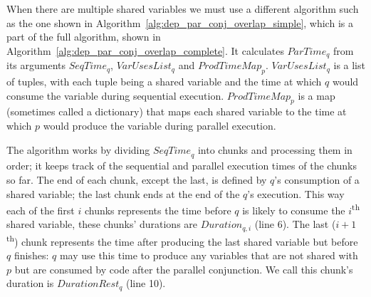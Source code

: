 When there are multiple shared variables we must use a different algorithm
such as the one shown in Algorithm~\ref{alg:dep_par_conj_overlap_simple},
which is a part of the full algorithm, shown in
Algorithm~\ref{alg:dep_par_conj_overlap_complete}.
It calculates $ParTime_q$ from its arguments $SeqTime_q$, $VarUsesList_q$ and
$ProdTimeMap_p$.
$VarUsesList_q$ is a list of tuples,
with each tuple being a shared variable and the time at which $q$ would
consume the variable during sequential execution.
$ProdTimeMap_p$ is a map (sometimes called a dictionary)
that maps each shared variable to the time at which $p$ would produce the
variable during parallel execution.


The algorithm works by dividing ${SeqTime}_q$ into chunks
and processing them in order;
it keeps track of the sequential and parallel execution times of the
chunks so far.
The end of each chunk, except the last, is defined by $q$'s consumption of a
shared variable;
the last chunk ends at the end of the $q$'s execution.
This way each of the first $i$ chunks represents the time before $q$ is likely to
consume the $i$\textsuperscript{th} shared variable,
these chunks' durations are $Duration_{q, i}$ (line 6).
The last ($i+1$\textsuperscript{th}) chunk represents the time after
producing the last shared variable but before $q$ finishes:
$q$ may use this time to produce any variables that are not shared with $p$
but are consumed by code after the parallel conjunction.
We call this chunk's duration is $DurationRest_q$ (line 10).

